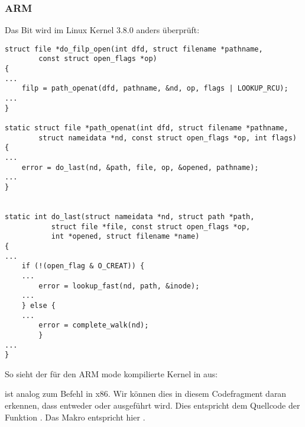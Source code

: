 \subsubsection{ARM}


Das  Bit wird im Linux Kernel 3.8.0 anders überprüft:

\begin{lstlisting}[caption=linux kernel 3.8.0,style=customc]
struct file *do_filp_open(int dfd, struct filename *pathname,
		const struct open_flags *op)
{
...
	filp = path_openat(dfd, pathname, &nd, op, flags | LOOKUP_RCU);
...
}

static struct file *path_openat(int dfd, struct filename *pathname,
		struct nameidata *nd, const struct open_flags *op, int flags)
{
...
	error = do_last(nd, &path, file, op, &opened, pathname);
...
}


static int do_last(struct nameidata *nd, struct path *path,
		   struct file *file, const struct open_flags *op,
		   int *opened, struct filename *name)
{
...
	if (!(open_flag & O_CREAT)) {
    ...
		error = lookup_fast(nd, path, &inode);
    ...
	} else {
    ...
		error = complete_walk(nd);
        }
...
}
\end{lstlisting}
So sieht der für den ARM mode kompilierte Kernel in \IDA aus:



 ist analog zum Befehl \TEST in x86.
Wir können dies in diesem Codefragment daran erkennen, dass entweder
 oder  ausgeführt wird.
Dies entspricht dem Quellcode der Funktion . 
Das Makro  entspricht hier .
